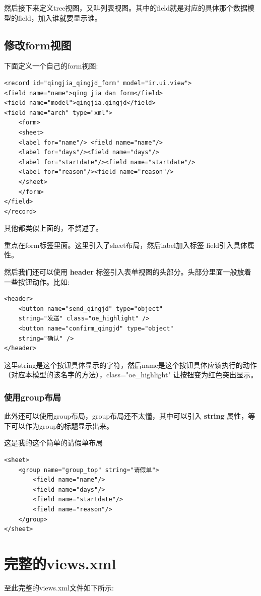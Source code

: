 \documentclass[11pt,a4paper]{sphinxmanual}
\begin{document}
然后接下来定义tree视图，又叫列表视图。其中的field就是对应的具体那个数据模型的field，加入谁就要显示谁。


\subsection{修改form视图}
\label{sec-6-4-2}
下面定义一个自己的form视图:
\begin{Verbatim}
<record id="qingjia_qingjd_form" model="ir.ui.view">
<field name="name">qing jia dan form</field>
<field name="model">qingjia.qingjd</field>
<field name="arch" type="xml">
    <form>
    <sheet>
    <label for="name"/> <field name="name"/>
    <label for="days"/><field name="days"/>
    <label for="startdate"/><field name="startdate"/>
    <label for="reason"/><field name="reason"/>
    </sheet>
    </form>
</field>
</record>
\end{Verbatim}
其他都类似上面的，不赘述了。

重点在form标签里面。这里引入了sheet布局，然后label加入标签 field引入具体属性。

然后我们还可以使用 \textbf{header} 标签引入表单视图的头部分。头部分里面一般放着一些按钮动作。比如:
\begin{Verbatim}
<header>
    <button name="send_qingjd" type="object"
    string="发送" class="oe_highlight" />
    <button name="confirm_qingjd" type="object"
    string="确认" />
</header>
\end{Verbatim}

这里string是这个按钮具体显示的字符，然后name是这个按钮具体应该执行的动作（对应本模型的该名字的方法），class="oe\_highlight" 让按钮变为红色突出显示。

\subsubsection{使用group布局}
\label{sec-6-4-2-1}
此外还可以使用group布局，group布局还不太懂，其中可以引入 \textbf{string} 属性，等下可以作为group的标题显示出来。

这是我的这个简单的请假单布局
\begin{Verbatim}
<sheet>
    <group name="group_top" string="请假单">
        <field name="name"/>
        <field name="days"/>
        <field name="startdate"/>
        <field name="reason"/>
    </group>
</sheet>
\end{Verbatim}



\section{完整的views.xml}
\label{sec-6-5}
至此完整的views.xml文件如下所示:
\end{document}

